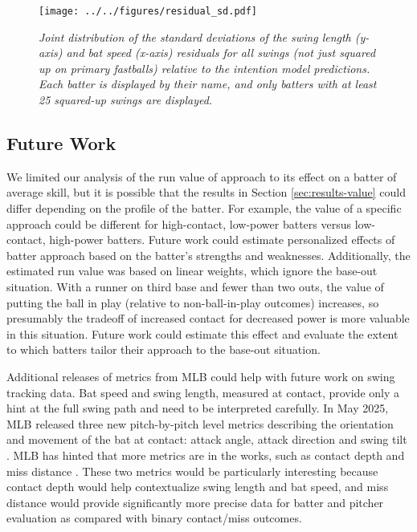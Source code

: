 \documentclass[
  12pt]{article}
\begin{document}
      \begin{figure}
        \centering
        \texttt{[image: ../../figures/residual\_sd.pdf]}
        \caption{\it Joint distribution of the standard deviations of the swing length (y-axis) and bat speed (x-axis) residuals for all swings (not just squared up on primary fastballs) relative to the intention model predictions. Each batter is displayed by their name, and only batters with at least 25 squared-up swings are displayed.}
        \label{fig:resid-sd}
      \end{figure}


    \subsection{Future Work}
    \label{sec:future-work}

      We limited our analysis of the run value of approach to its effect on a batter of average skill, but it is possible that the results in Section \ref{sec:results-value} could differ depending on the profile of the batter. For example, the value of a specific approach could be different for high-contact, low-power batters versus low-contact, high-power batters. Future work could estimate personalized effects of batter approach based on the batter's strengths and weaknesses. Additionally, the estimated run value was based on linear weights, which ignore the base-out situation. With a runner on third base and fewer than two outs, the value of putting the ball in play (relative to non-ball-in-play outcomes) increases, so presumably the tradeoff of increased contact for decreased power is more valuable in this situation. Future work could estimate this effect and evaluate the extent to which batters tailor their approach to the base-out situation.

      Additional releases of metrics from MLB could help with future work on swing tracking data. Bat speed and swing length, measured at contact, provide only a hint at the full swing path and need to be interpreted carefully. In May 2025, MLB released three new pitch-by-pitch level metrics describing the orientation and movement of the bat at contact: attack angle, attack direction and swing tilt \citep{petriello_4_2025}. MLB has hinted that more metrics are in the works, such as contact depth and miss distance \citep{petriello_everything_2024}. These two metrics would be particularly interesting because contact depth would help contextualize swing length and bat speed, and miss distance would provide significantly more precise data for batter and pitcher evaluation as compared with binary contact/miss outcomes.
 
\end{document}
